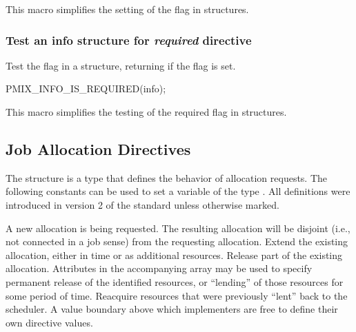 This macro simplifies the setting of the  flag in  structures.

\subsubsection{Test an info structure for \textit{required} directive}

\summary

Test the  flag in a  structure, returning  if the flag is set.

\cspecificstart
\begin{codepar}
PMIX_INFO_IS_REQUIRED(info);
\end{codepar}
\cspecificend

\begin{arglist}
\end{arglist}

This macro simplifies the testing of the required flag in  structures.



\subsection{Job Allocation Directives}

The  structure is a  type that defines the behavior of allocation requests.
The following constants can be used to set a variable of the type . All definitions were introduced in version 2 of the standard unless otherwise marked.

\begin{constantdesc}
%
A new allocation is being requested.
The resulting allocation will be disjoint (i.e., not connected in a job sense) from the requesting allocation.
%
Extend the existing allocation, either in time or as additional resources.
%
Release part of the existing allocation.
Attributes in the accompanying  array may be used to specify permanent release of the identified resources, or ``lending'' of those resources for some period of time.
%
Reacquire resources that were previously ``lent'' back to the scheduler.
%
A value boundary above which implementers are free to define their own directive values.
%
\end{constantdesc}




